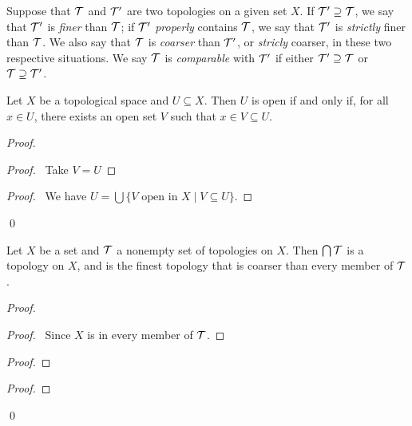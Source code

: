 \begin{definition}
    Suppose that $\mathcal{T}$ and $\mathcal{T}'$ are two topologies on a given set $X$. If $\mathcal{T}' \supseteq \mathcal{T}$, we say that $\mathcal{T}'$ is \emph{finer} than
    $\mathcal{T}$; if $\mathcal{T}'$ \emph{properly} contains $\mathcal{T}$, we say that $\mathcal{T}'$ is \emph{strictly} finer than $\mathcal{T}$. We also say that $\mathcal{T}$ is
    \emph{coarser} than $\mathcal{T}'$, or \emph{stricly} coarser, in these two respective situations. We say $\mathcal{T}$ is \emph{comparable} with
    $\mathcal{T}'$ if either $\mathcal{T}' \supseteq \mathcal{T}$ or $\mathcal{T} \supseteq \mathcal{T}'$.
\end{definition}

\begin{lemma}
    \label{lemma:open}
    Let $X$ be a topological space and $U \subseteq X$. Then $U$ is open if and only if, for all $x \in U$,
    there exists an open set $V$ such that $x \in V \subseteq U$.
\end{lemma}

\begin{proof}
    \pf
    \begin{proof}
        \pf\ Take $V = U$
    \end{proof}
    \begin{proof}
        \pf\ We have $U = \bigcup \{ V \text{ open in } X \mid V \subseteq U \}$.
    \end{proof}
    \qed
\end{proof}

\begin{lemma}
    Let $X$ be a set and $\mathcal{T}$ a nonempty set of topologies on $X$. Then $\bigcap \mathcal{T}$ is a topology on $X$,
    and is the finest topology that is coarser than every member of $\mathcal{T}$.
\end{lemma}

\begin{proof}
    \pf
    \begin{proof}
        \pf\ Since $X$ is in every member of $\mathcal{T}$.
    \end{proof}
    \begin{proof}
    \end{proof}
    \begin{proof}
    \end{proof}
    \qed
\end{proof}

